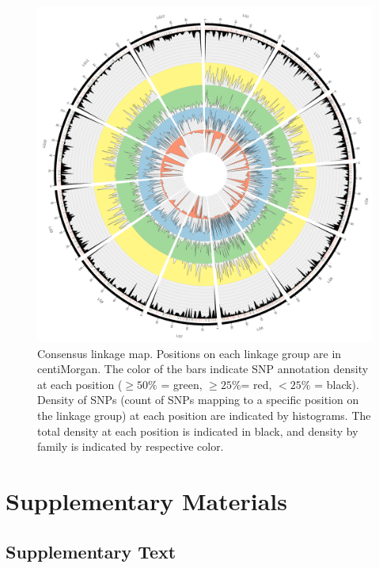 \documentclass[smallextended]{svjour3}
\newcommand{\beginsupplement}{%
        \setcounter{table}{0}
        \renewcommand{\thetable}{S\arabic{table}}
        \setcounter{figure}{0}
        \renewcommand{\thefigure}{S\arabic{figure}}
        \renewcommand{\thesection}{S\arabic{section}}
        \renewcommand{\thesubsection}{S\arabic{subsection}} 
     }
\begin{document}
\begin{figure}[ht]
  \centering
  \includegraphics[width=\textwidth]{circos_con}
  \caption{Consensus linkage map.  Positions on each linkage group are in
    centiMorgan. The color of the bars indicate SNP annotation density at each
    position ($\ge 50\%$ = green, $\ge 25\%$= red, $< 25\%$ = black). Density of
    SNPs (count of SNPs mapping to a specific position on the linkage group) at
    each position are indicated by histograms. The total density at each
    position is indicated in black, and density by family is indicated by
    respective color.}
  \label{f:con}
\end{figure}

\clearpage

\beginsupplement

\section*{Supplementary Materials}

\subsection*{Supplementary Text}\label{ss:supp}
\end{document}
